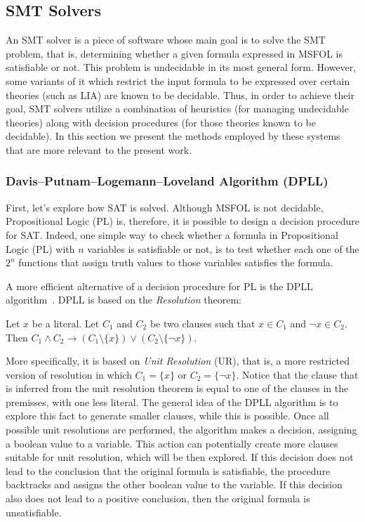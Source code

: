 \subsection{SMT Solvers}

An SMT solver is a piece of software whose main goal is to solve the SMT problem, that is, determining whether a given formula expressed in MSFOL is satisfiable or not.
%
This problem is undecidable in its most general form. However, some variants of it which restrict the input formula
to be expressed over certain theories (such as LIA) are known to be decidable.
%
Thus, in order to achieve their goal, SMT solvers utilize a combination of
heuristics (for managing undecidable theories) along with decision procedures (for those theories known to be decidable).
%
In this section we present the methods employed by these systems that are more relevant to the present work.

\subsubsection{Davis–Putnam–Logemann–Loveland Algorithm (DPLL)}

First, let’s explore how SAT is solved. Although MSFOL is not decidable, Propositional Logic (PL) is, therefore, it is possible to design a decision procedure for SAT.\@
%
Indeed, one simple way to check whether a formula in Propositional Logic (PL) with $n$ variables is satisfiable or not, is to
test whether each one of the $2^{n}$ functions that assign truth values to those variables satisfies the formula.

A more efficient alternative of a decision procedure for PL is the DPLL algorithm~\cite{dpll}. DPLL is based on the \textit{Resolution} theorem:

\begin{theorem}[Resolution]\label{res_theorem}
Let $x$ be a literal. Let $C_{1}$ and $C_{2}$ be two clauses such that $x \in C_{1}$ and $\neg x \in C_{2}$. Then $C_{1} \wedge C_{2} \rightarrow (C_{1} \setminus \{x\}) \vee (C_{2} \setminus \{\neg x\})$.
\end{theorem}
More specifically, it is based on \textit{Unit Resolution} (UR), that is, a more restricted version of resolution in which $C_{1} = \{x\}$ or $C_{2} = \{\neg x\}$. Notice that the clause that is inferred from the unit resolution theorem is equal to one of the clauses in the premisses, with one less literal. The general idea of the DPLL algorithm is to explore this fact to generate smaller clauses, while this is possible. Once all possible unit resolutions are performed, the algorithm makes a decision, assigning a boolean value to a variable. This action can potentially create more clauses suitable for unit resolution, which will be then explored. If this decision does not lead to the conclusion that the original formula is satisfiable, the procedure backtracks and assigns the other boolean value to the variable. If this decision also does not lead to a positive conclusion, then the original formula is unsatisfiable.

